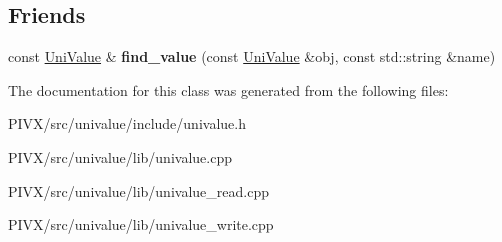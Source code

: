 \subsection*{Friends}
\begin{DoxyCompactItemize}
\item 
\mbox{\label{class_uni_value_a33625d562f1ef5f44ceb171d5c8f2a85}} 
const \mbox{\hyperlink{class_uni_value}{Uni\+Value}} \& {\bfseries find\+\_\+value} (const \mbox{\hyperlink{class_uni_value}{Uni\+Value}} \&obj, const std\+::string \&name)
\end{DoxyCompactItemize}


The documentation for this class was generated from the following files\+:\begin{DoxyCompactItemize}
\item 
P\+I\+V\+X/src/univalue/include/univalue.\+h\item 
P\+I\+V\+X/src/univalue/lib/univalue.\+cpp\item 
P\+I\+V\+X/src/univalue/lib/univalue\+\_\+read.\+cpp\item 
P\+I\+V\+X/src/univalue/lib/univalue\+\_\+write.\+cpp\end{DoxyCompactItemize}
